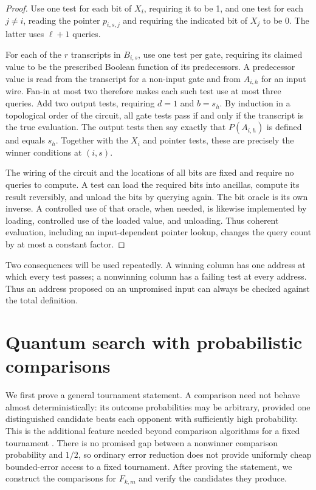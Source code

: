 \documentclass[11pt]{article}
\theoremstyle{definition}
\begin{document}
\begin{proof}
Use one test for each bit of $X_i$, requiring it to be 1, and one test
for each $j\ne i$, reading the pointer $p_{i,s,j}$ and requiring the
indicated bit of $X_j$ to be 0.  The latter uses $\ell+1$ queries.

For each of the $r$ transcripts in $B_{i,s}$, use one test per gate,
requiring its claimed value to be the prescribed Boolean function of its
predecessors.  A predecessor value is read from the transcript for a
non-input gate and from $A_{i,h}$ for an input wire.  Fan-in at most two
therefore makes each such test use at most three queries.  Add two output
tests, requiring $d=1$ and $b=s_h$.  By induction in a topological order
of the circuit, all gate tests pass if and only if the transcript is the
true evaluation.  The output tests then say exactly that $P(A_{i,h})$ is
defined and equals $s_h$.  Together with the $X_i$ and pointer tests,
these are precisely the winner conditions at $(i,s)$.

The wiring of the circuit and the locations of all bits are fixed and
require no queries to compute.  A test can load the required bits into
ancillas, compute its result reversibly, and unload the bits by querying
again.  The bit oracle is its own inverse.  A controlled use of that
oracle, when needed, is likewise implemented by loading, controlled use
of the loaded value, and unloading.  Thus coherent evaluation, including
an input-dependent pointer lookup, changes the query count by at most a
constant factor.
\end{proof}

Two consequences will be used repeatedly.  A winning column has one
address at which every test passes; a nonwinning column has a failing
test at every address.  Thus an address proposed on an unpromised input
can always be checked against the total definition.

\section{Quantum search with probabilistic comparisons}\label{sec:quantum}

We first prove a general tournament statement. A comparison need not
behave almost deterministically: its outcome probabilities may be
arbitrary, provided one distinguished candidate beats each opponent
with sufficiently high probability. This is the additional feature needed
beyond comparison algorithms for a fixed tournament
\cite{SYZ04,MPS23,BK26}. There is no promised gap between a nonwinner
comparison probability and $1/2$, so ordinary error reduction does not
provide uniformly cheap bounded-error access to a fixed tournament.
After proving the statement, we
construct the comparisons for $F_{k,m}$ and verify the candidates they
produce.
\end{document}
